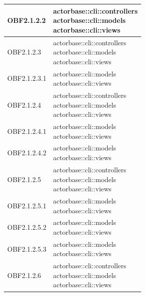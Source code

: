 \documentclass{scalatekids-article}
\begin{document}
\begin{longtable}[H]{|p{3.5cm}|p{7.5cm}|}
\hline
OBF2.1.2.2 & \multiLineCell[t]{actorbase::cli::controllers\\actorbase::cli::models\\actorbase::cli::views\\}\\
\hline
OBF2.1.2.3 & \multiLineCell[t]{actorbase::cli::controllers\\actorbase::cli::models\\actorbase::cli::views\\}\\
\hline
OBF2.1.2.3.1 & \multiLineCell[t]{actorbase::cli::models\\actorbase::cli::views\\}\\
\hline
OBF2.1.2.4 & \multiLineCell[t]{actorbase::cli::controllers\\actorbase::cli::models\\actorbase::cli::views\\}\\
\hline
OBF2.1.2.4.1 & \multiLineCell[t]{actorbase::cli::models\\actorbase::cli::views\\}\\
\hline
OBF2.1.2.4.2 & \multiLineCell[t]{actorbase::cli::models\\actorbase::cli::views\\}\\
\hline
OBF2.1.2.5 & \multiLineCell[t]{actorbase::cli::controllers\\actorbase::cli::models\\actorbase::cli::views\\}\\
\hline
OBF2.1.2.5.1 & \multiLineCell[t]{actorbase::cli::models\\actorbase::cli::views\\}\\
\hline
OBF2.1.2.5.2 & \multiLineCell[t]{actorbase::cli::models\\actorbase::cli::views\\}\\
\hline
OBF2.1.2.5.3 & \multiLineCell[t]{actorbase::cli::models\\actorbase::cli::views\\}\\
\hline
OBF2.1.2.6 & \multiLineCell[t]{actorbase::cli::controllers\\actorbase::cli::models\\actorbase::cli::views\\}\\

\end{longtable}
\end{document}
